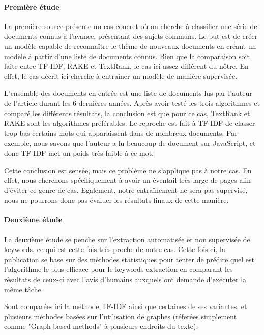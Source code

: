 			\paragraph{Première étude}
			
				La première source\cite{text-analysis-src4} présente un cas concret où on cherche à classifier une série de documents connus à l'avance, présentant des sujets communs. Le but est de créer un modèle capable de reconnaître le thème de nouveaux documents  en créant un modèle à partir d'une liste de documents connus. Bien que la comparaison soit faite entre TF-IDF, RAKE et TextRank, le cas ici assez différent du nôtre. En effet, le cas décrit ici cherche à entraîner un modèle de manière supervisée. 

				L'ensemble des documents en entrée est une liste de documents lus par l'auteur de l'article durant les 6 dernières années. Après avoir testé les trois algorithmes et comparé les différents résultats, la conclusion est que pour ce cas, TextRank et RAKE sont les algorithmes préférables. Le reproche est fait à TF-IDF de classer trop bas certains mots qui apparaissent dans de nombreux documents. Par exemple, nous savons que l'auteur a lu beaucoup de document sur JavaScript, et donc TF-IDF met un poids très faible à ce mot.

				Cette conclusion est sensée, mais ce problème ne s'applique pas à notre cas. En effet, nous cherchons spécifiquement à avoir un éventail très large de pages afin d'éviter ce genre de cas. Egalement, notre entraînement ne sera pas supervisé, nous ne pourrons donc pas évaluer les résultats finaux de cette manière.

			\paragraph{Deuxième étude}

				La deuxième étude\cite{text-analysis-src5} se penche sur l'extraction automatisée et non supervisée de keywords, ce qui est cette fois très proche de notre cas. Cette fois-ci, la publication se base sur des méthodes statistiques pour tenter de prédire quel est l'algorithme le plus efficace pour le keywords extraction en comparant les résultats de ceux-ci avec l'avis d'humains auxquels ont demande d'exécuter la même tâche.

				Sont comparées ici la méthode TF-IDF ainsi que certaines de ses variantes, et plusieurs méthodes basées sur l'utilisation de graphes (réferées simplement comme "Graph-based methods" à plusieurs endroits du texte).

